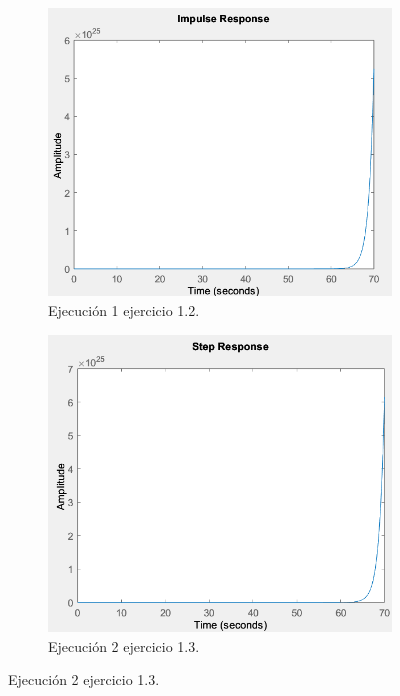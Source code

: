 \documentclass[a4paper, 12pt]{article}
\begin{document}
    \begin{figure}[ht]
		\begin{subfigure}{0.49\textwidth}
			\centering
			\includegraphics[width=\textwidth]{figures/Parte2Ej1p3f1.png}
            \caption{Ejecución 1 ejercicio 1.2.}
		\end{subfigure}
		\begin{subfigure}{0.49\textwidth}
			\centering
			\includegraphics[width=\textwidth]{figures/Parte2Ej1p3f2.png}
            \caption{Ejecución 2 ejercicio 1.3.}
		\end{subfigure}
	\end{figure}
        
\end{document}

